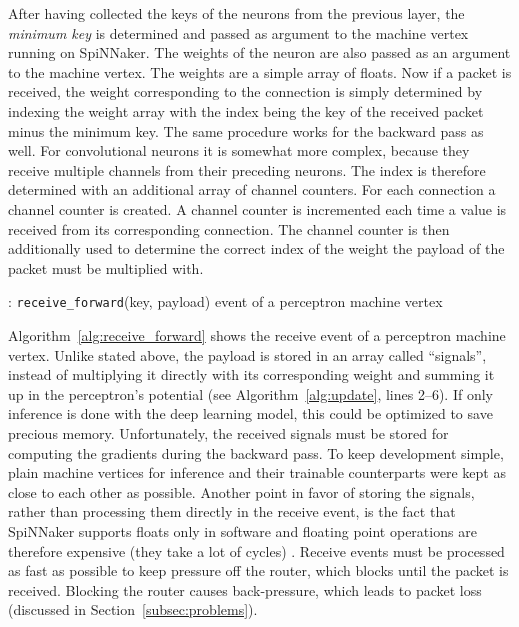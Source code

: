 \documentclass[]{article}
\begin{document}
After having collected the keys of the neurons from the previous
layer, the \textit{minimum key} is determined and passed as argument
to the machine vertex running on SpiNNaker.
The weights of the neuron are also passed as an argument to the
machine vertex.
The weights are a simple array of floats.
Now if a packet is received, the weight corresponding to the
connection is simply determined by indexing the weight array with the
index being the key of the received packet minus the minimum key.
The same procedure works for the backward pass as well.
For convolutional neurons it is somewhat more complex, because they
receive multiple channels from their preceding neurons.
The index is therefore determined with an additional array of channel
counters.
For each connection a channel counter is created.
A channel counter is incremented each time a value is received from
its corresponding connection.
The channel counter is then additionally used to determine the correct
index of the weight the payload of the packet must be multiplied with.

\begin{algorithm} %
  \caption{: \texttt{receive\_forward}(key, payload) event of a
    perceptron machine vertex}
  \label{alg:receive_forward}

  \begin{algorithmic}[1]
  \end{algorithmic}
\end{algorithm} %

Algorithm~\ref{alg:receive_forward} shows the receive event of a
perceptron machine vertex.
Unlike stated above, the payload is stored in an array called
``signals'',
instead of multiplying it directly with its corresponding weight and
summing it up in the perceptron's potential
(see Algorithm~\ref{alg:update}, lines 2--6).
If only inference is done with the deep learning model, this could
be optimized to save precious memory.
Unfortunately, the received signals must be stored for computing the
gradients during the backward pass.
To keep development simple, plain machine vertices for inference and
their trainable counterparts were kept as close to each other as
possible.
Another point in favor of storing the signals, rather than processing
them directly in the receive event, is the fact that SpiNNaker
supports floats only in software and floating point operations are
therefore expensive (they take a lot of cycles)
\citep{furber_et_al_2020}.
Receive events must be processed as fast as possible to keep pressure
off the router, which blocks until the packet is received.
Blocking the router causes back-pressure, which leads to packet loss
(discussed in Section~\ref{subsec:problems}).
\end{document}

